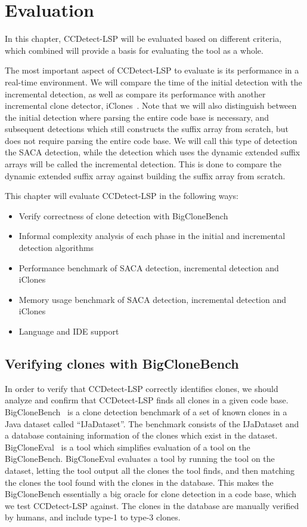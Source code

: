 \chapter{Evaluation}
\label{evaluation}

In this chapter, CCDetect-LSP will be evaluated based on different criteria, which combined
will provide a basis for evaluating the tool as a whole.

The most important aspect of CCDetect-LSP to evaluate is its performance in a real-time
environment. We will compare the time of the initial detection with the incremental
detection, as well as compare its performance with another incremental clone detector,
iClones~\Cite{GodeIncrementalCloneDetection}. Note that we will also distinguish between
the initial detection where parsing the entire code base is necessary, and subsequent
detections which still constructs the suffix array from scratch, but does not require
parsing the entire code base. We will call this type of detection the SACA detection,
while the detection which uses the dynamic extended suffix arrays will be called the
incremental detection. This is done to compare the dynamic extended suffix array against
building the suffix array from scratch.

This chapter will evaluate CCDetect-LSP in the following ways:

\begin{itemize}
    \item Verify correctness of clone detection with BigCloneBench
    \item Informal complexity analysis of each phase in the initial and incremental
        detection algorithms
    \item Performance benchmark of SACA detection, incremental detection and iClones
    \item Memory usage benchmark of SACA detection, incremental detection and iClones
    \item Language and IDE support
\end{itemize}



\section{Verifying clones with BigCloneBench}

In order to verify that CCDetect-LSP correctly identifies clones, we should analyze and
confirm that CCDetect-LSP finds all clones in a given code base.
BigCloneBench~\cite{BigCloneBench} is a clone detection benchmark of a set of known clones
in a Java dataset called ``IJaDataset''. The benchmark consists of the IJaDataset and a
database containing information of the clones which exist in the dataset.
BigCloneEval~\cite{BigCloneEval} is a tool which simplifies evaluation of a tool on the
BigCloneBench. BigCloneEval evaluates a tool by running the tool on the dataset, letting
the tool output all the clones the tool finds, and then matching the clones the tool found
with the clones in the database. This makes the BigCloneBench essentially a big oracle for
clone detection in a code base, which we test CCDetect-LSP against. The clones in the
database are manually verified by humans, and include type-1 to type-3 clones.

